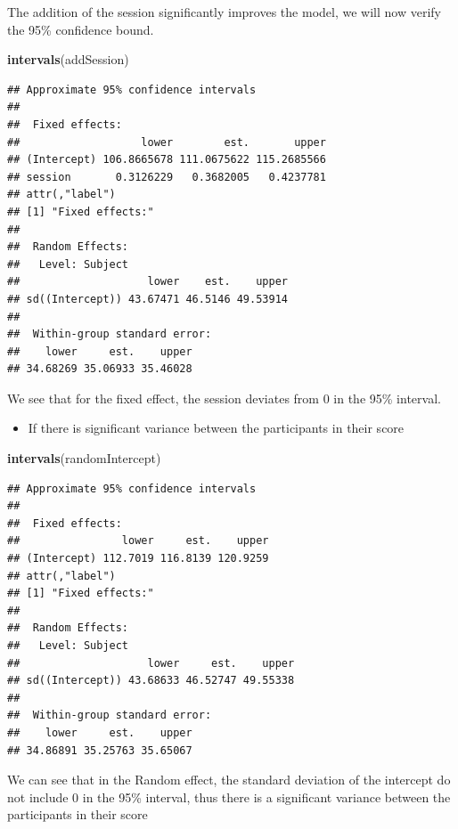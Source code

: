 \documentclass[]{article}
\newenvironment{Shaded}{\begin{snugshade}}{\end{snugshade}}
\newcommand{\KeywordTok}[1]{\textcolor[rgb]{0.13,0.29,0.53}{\textbf{#1}}}
\newcommand{\NormalTok}[1]{#1}
\providecommand{\tightlist}{%
  \setlength{\itemsep}{0pt}\setlength{\parskip}{0pt}}
\begin{document}
The addition of the session significantly improves the model, we will
now verify the 95\% confidence bound.

\begin{Shaded}
\begin{Highlighting}[]
\KeywordTok{intervals}\NormalTok{(addSession)}
\end{Highlighting}
\end{Shaded}

\begin{verbatim}
## Approximate 95% confidence intervals
## 
##  Fixed effects:
##                   lower        est.       upper
## (Intercept) 106.8665678 111.0675622 115.2685566
## session       0.3126229   0.3682005   0.4237781
## attr(,"label")
## [1] "Fixed effects:"
## 
##  Random Effects:
##   Level: Subject 
##                    lower    est.    upper
## sd((Intercept)) 43.67471 46.5146 49.53914
## 
##  Within-group standard error:
##    lower     est.    upper 
## 34.68269 35.06933 35.46028
\end{verbatim}

We see that for the fixed effect, the session deviates from 0 in the
95\% interval.

\begin{itemize}
\tightlist
\item
  If there is significant variance between the participants in their
  score
\end{itemize}

\begin{Shaded}
\begin{Highlighting}[]
\KeywordTok{intervals}\NormalTok{(randomIntercept)}
\end{Highlighting}
\end{Shaded}

\begin{verbatim}
## Approximate 95% confidence intervals
## 
##  Fixed effects:
##                lower     est.    upper
## (Intercept) 112.7019 116.8139 120.9259
## attr(,"label")
## [1] "Fixed effects:"
## 
##  Random Effects:
##   Level: Subject 
##                    lower     est.    upper
## sd((Intercept)) 43.68633 46.52747 49.55338
## 
##  Within-group standard error:
##    lower     est.    upper 
## 34.86891 35.25763 35.65067
\end{verbatim}

We can see that in the Random effect, the standard deviation of the
intercept do not include 0 in the 95\% interval, thus there is a
significant variance between the participants in their score
\end{document}
